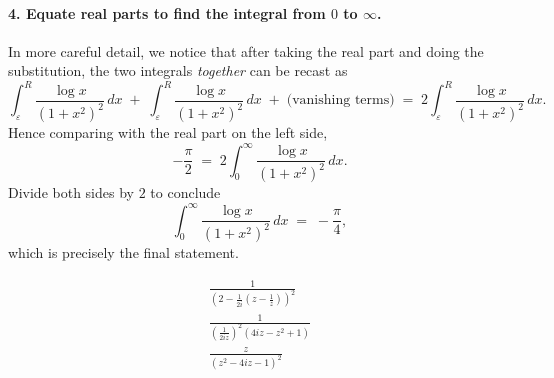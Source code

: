 \documentclass[12pt]{article}
\theoremstyle{definition} %
\theoremstyle{plain} %
\begin{document}
\paragraph{4. Equate real parts to find the integral from \(0\) to \(\infty\).}

In more careful detail, we notice that after taking the real part and doing the substitution, the two integrals \emph{together} can be recast as
\[
\int_{\varepsilon}^{R} \frac{\log x}{(1 + x^2)^2}\,dx 
\;+\;
\int_{\varepsilon}^{R} \frac{\log x}{(1 + x^2)^2}\,dx
\;+\;\text{(vanishing terms)}
\;=\;
2 \int_{\varepsilon}^{R} \frac{\log x}{(1 + x^2)^2}\,dx.
\]
Hence comparing with the real part on the left side,
\[
-\frac{\pi}{2} 
\;=\;
2 \int_{0}^{\infty} \frac{\log x}{(1 + x^2)^2}\,dx.
\]
Divide both sides by \(2\) to conclude
\[
\int_{0}^{\infty} \frac{\log x}{(1 + x^2)^2}\,dx
\;=\;
-\frac{\pi}{4},
\]
which is precisely the final statement.

\begin{align}
    \frac{1}{(2-\frac{1}{2i}(z-\frac{1}{z}))^{2}} \\[10pt] 
    \frac{1}{(\frac{1}{2iz})^{2}(4iz-z^{2}+1)} \\[10pt] 
    \frac{z}{(z^{2}-4iz-1)^{2}}
\end{align}
\end{document}
